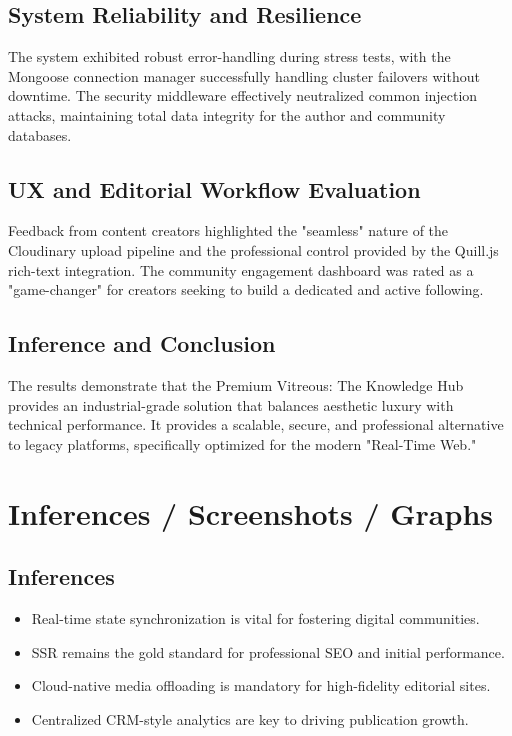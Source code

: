 \documentclass[12pt,a4paper]{report}
\begin{document}
\subsection{System Reliability and Resilience}
The system exhibited robust error-handling during stress tests, with the Mongoose connection manager successfully handling cluster failovers without downtime. The security middleware effectively neutralized common injection attacks, maintaining total data integrity for the author and community databases.

\subsection{UX and Editorial Workflow Evaluation}
Feedback from content creators highlighted the "seamless" nature of the Cloudinary upload pipeline and the professional control provided by the Quill.js rich-text integration. The community engagement dashboard was rated as a "game-changer" for creators seeking to build a dedicated and active following.

\subsection{Inference and Conclusion}
The results demonstrate that the Premium Vitreous: The Knowledge Hub provides an industrial-grade solution that balances aesthetic luxury with technical performance. It provides a scalable, secure, and professional alternative to legacy platforms, specifically optimized for the modern "Real-Time Web."

\section{Inferences / Screenshots / Graphs}

\subsection{Inferences}
\begin{itemize}
    \item Real-time state synchronization is vital for fostering digital communities.
    \item SSR remains the gold standard for professional SEO and initial performance.
    \item Cloud-native media offloading is mandatory for high-fidelity editorial sites.
    \item Centralized CRM-style analytics are key to driving publication growth.
\end{itemize}
\end{document}
